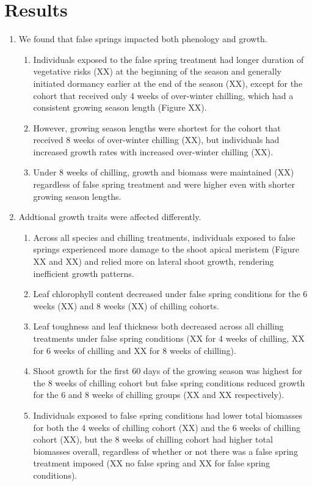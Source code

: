 \documentclass{article}\usepackage[]{graphicx}\usepackage[]{color}
\begin{document}
\section*{Results}
\begin{enumerate}
\item We found that false springs impacted both phenology and growth. 
  \begin{enumerate}
  \item Individuals exposed to the false spring treatment had longer duration of vegetative risks (XX) at the beginning of the season and generally initiated dormancy earlier at the end of the season (XX), except for the cohort that received only 4 weeks of over-winter chilling, which had a consistent growing season length (Figure XX). 
  \item However, growing season lengths were shortest for the cohort that received 8 weeks of over-winter chilling (XX), but individuals had increased growth rates with increased over-winter chilling (XX). 
  \item Under 8 weeks of chilling, growth and biomass were maintained (XX) regardless of false spring treatment and were higher even with shorter growing season lengths.
  \end{enumerate}
  
\item Addtional growth traits were affected differently.
  \begin{enumerate}
  \item Across all species and chilling treatments, individuals exposed to false springs experienced more damage to the shoot apical meristem (Figure XX and XX) and relied more on lateral shoot growth, rendering inefficient growth patterns. 
  \item Leaf chlorophyll content decreased under false spring conditions for the 6 weeks (XX) and 8 weeks (XX) of chilling cohorts.
  \item Leaf toughness and leaf thickness both decreased across all chilling treatments under false spring conditions (XX for 4 weeks of chilling, XX for 6 weeks of chilling and XX for 8 weeks of chilling).
  \item Shoot growth for the first 60 days of the growing season was highest for the 8 weeks of chilling cohort but false spring conditions reduced growth for the 6 and 8 weeks of chilling groups (XX and XX respectively).
  \item Individuals exposed to false spring conditions had lower total biomasses for both the 4 weeks of chilling cohort (XX) and the 6 weeks of chilling cohort (XX), but the 8 weeks of chilling cohort had higher total biomasses overall, regardless of whether or not there was a false spring treatment imposed (XX no false spring and XX for false spring conditions).
  \end{enumerate}
  

\end{enumerate}
\end{document}
